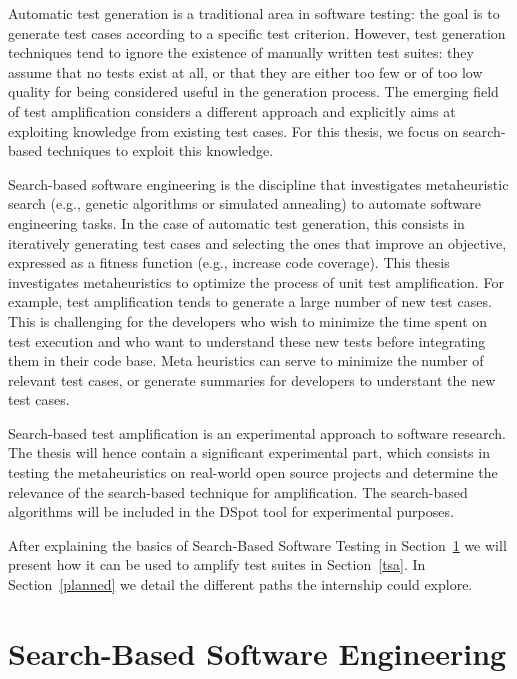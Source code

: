 \documentclass[11pt]{sdm}
\begin{document}
Automatic test generation is a traditional area in software testing: the goal is to generate test cases according to a specific test criterion. However, test generation techniques tend to ignore the existence of manually written test suites: they assume that no tests exist at all, or that they are  either too few or of too low quality for being considered useful in the generation process. The emerging field of test amplification considers a different approach and explicitly aims at exploiting knowledge from existing test cases. For this thesis, we focus on search-based techniques to exploit this knowledge. 

Search-based software engineering is the discipline that investigates metaheuristic search (e.g., genetic algorithms or simulated annealing) to automate software engineering tasks. In the case of automatic test generation, this consists in iteratively generating test cases and selecting the ones that improve an objective, expressed as a fitness function (e.g., increase code coverage). This thesis investigates metaheuristics to optimize the process of unit test amplification. For example, test amplification tends to generate a large number of new test cases. This is challenging for the developers who wish to minimize the time spent on test execution and who want to understand these new tests before integrating them in their code base. Meta heuristics can serve to minimize the number of relevant test cases, or generate summaries  for developers to understant the new test cases. 

Search-based test amplification is an experimental approach to software research. The thesis will hence contain a significant experimental part, which consists in testing the metaheuristics on real-world open source projects and determine the relevance of the search-based technique for amplification. The search-based algorithms will be included in the DSpot tool for experimental purposes.

After explaining the basics of Search-Based Software Testing in Section~\ref{sbse} we will present how it can be used to amplify test suites in Section~\ref{tsa}.
In Section~\ref{planned} we detail the different paths the internship could explore.


\section{Search-Based Software Engineering}
\label{sbse}
\end{document}
